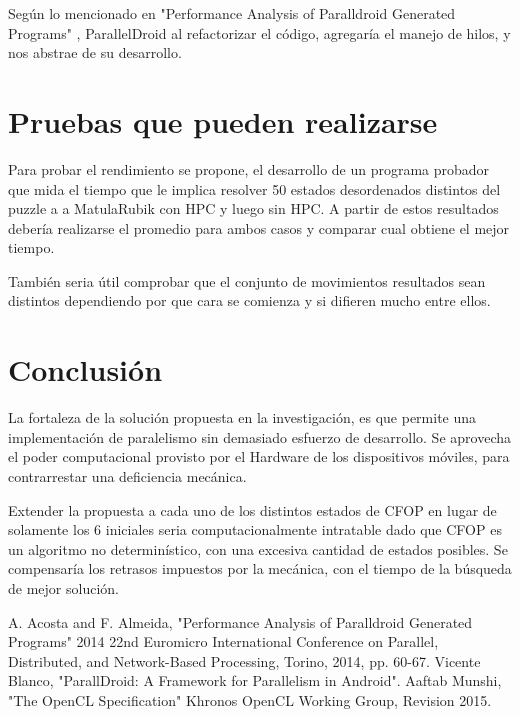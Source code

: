 \documentclass[runningheads,a4paper]{llncs}
\begin{document}
Según lo mencionado en "Performance Analysis of Paralldroid Generated Programs" \cite{jour}, ParallelDroid al refactorizar el código, agregaría el manejo de hilos, y nos abstrae de su desarrollo.



\section{Pruebas que pueden realizarse}
Para probar el rendimiento se propone, el desarrollo de un programa probador que mida el tiempo que le implica resolver 50 estados desordenados distintos del  puzzle a a MatulaRubik con HPC y luego sin HPC. A partir de estos resultados debería realizarse el promedio para ambos casos y comparar cual obtiene el mejor tiempo.

También seria útil comprobar que el conjunto de movimientos resultados sean distintos dependiendo por que cara se comienza y si difieren mucho entre ellos.

\section{Conclusión}

La fortaleza de la solución propuesta en la investigación, es que permite una implementación de paralelismo sin demasiado esfuerzo de desarrollo. Se aprovecha el poder computacional provisto por el Hardware de los dispositivos móviles, para contrarrestar una deficiencia mecánica. 

Extender la propuesta a cada uno de los distintos estados de CFOP en lugar de solamente los 6 iniciales seria computacionalmente intratable dado que CFOP es un algoritmo no determinístico, con una excesiva cantidad de estados posibles. Se compensaría los retrasos impuestos por la mecánica, con el tiempo de la búsqueda de mejor solución. 


\begin{thebibliography}{4}
 A. Acosta and F. Almeida, "Performance Analysis of Paralldroid Generated Programs" 2014 22nd Euromicro International Conference on Parallel, Distributed, and Network-Based Processing, Torino, 2014, pp. 60-67.
 Vicente Blanco, "ParallDroid: A Framework for Parallelism in Android".
 Aaftab Munshi, "The OpenCL Specification" Khronos OpenCL Working Group, Revision 2015.
 \end{thebibliography}
\end{document}

